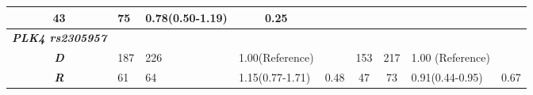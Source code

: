 \documentclass[journal,article,submit,moreauthors,pdftex]{Definitions/mdpi}
\begin{document}
\begin{table}[H]
{\begin{tabular}{clllccccl}
  43 &
  75 &
  0.78(0.50-1.19) &
  \multicolumn{1}{c}{0.25} \\ \hline
\textit{\textbf{PLK4 rs2305957}} &
   &
   &
   &
   &
   &
   &
  \multicolumn{1}{l}{} &
   \\ \hline
\textit{\textbf{D}} &
  187 &
  226 &
  1.00(Reference) &
   &
  153 &
  217 &
  1.00 (Reference) &
   \\ \hline
\textit{\textbf{R}} &
  61 &
  64 &
  1.15(0.77-1.71) &
  0.48 &
  47 &
  73 &
  \multicolumn{1}{l}{0.91(0.44-0.95)} &
  \multicolumn{1}{c}{0.67} \\ \hline
\end{tabular}%
}
\label{tab:Allele analysis in WBC and CV}
\end{table}



\begin{table}[H]
\caption{Odds ratio and confidence intervals with p-value calculated under a model of co-dominance for the heterozygous DR and homozygous recessive RR genotypes at the considered genetic loci. Data relative to \textit{MTHFR} rs1801133 in WBC on the left and to \textit{NKG2D} rs2617170 in CV on the right.}
\centering
{}
\end{table}
\end{document}
